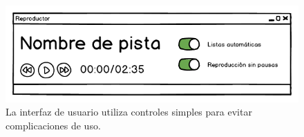 \begin{figure}[h!]
\centering
\includegraphics[width=15cm]{./Figuras/window}
\caption[Interfaz de usuario]{La interfaz de usuario utiliza controles simples para evitar complicaciones de uso.}
\label{fig:inter}
\end{figure}